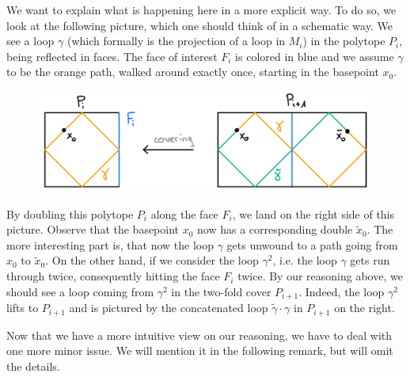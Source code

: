 \begin{remark}
    We want to explain what is happening here in a more explicit way.
    To do so, we look at the following picture, which one should think of in a schematic way.
    We see a loop \(\gamma\) (which formally is the projection of a loop in \(M_i\)) in the polytope \(P_i\), being reflected in faces.
    The face of interest \(F_i\) is colored in blue and we assume \(\gamma\) to be the orange path, walked around exactly once, starting in the basepoint \(x_0\).
    \begin{figure}[h!]
        \label{fig:ray}
        \centering
        \includegraphics[width=.8\textwidth]{gfx/Ray bouncing in P.png}
    \end{figure}\vspace*{-\parskip}

    \noindent
    By doubling this polytope \(P_i\) along the face \(F_i\), we land on the right side of this picture.
    Observe that the basepoint \(x_0\) now has a corresponding double \(\widetilde{x}_0\).
    The more interesting part is, that now the loop \(\gamma\) gets unwound to a path going from \(x_0\) to \(\widetilde{x}_0\).
    On the other hand, if we consider the loop \(\gamma^2\), i.e. the loop \(\gamma\) gets run through twice, consequently hitting the face \(F_i\) twice.
    By our reasoning above, we should see a loop coming from \(\gamma^2\) in the two-fold cover \(P_{i+1}\).
    Indeed, the loop \(\gamma^2\) lifts to \(P_{i+1}\) and is pictured by the concatenated loop \(\widetilde{\gamma} \cdot \gamma\) in \(P_{i+1}\) on the right.
\end{remark}

Now that we have a more intuitive view on our reasoning, we have to deal with one more minor issue.
We will mention it in the following remark, but will omit the details.

